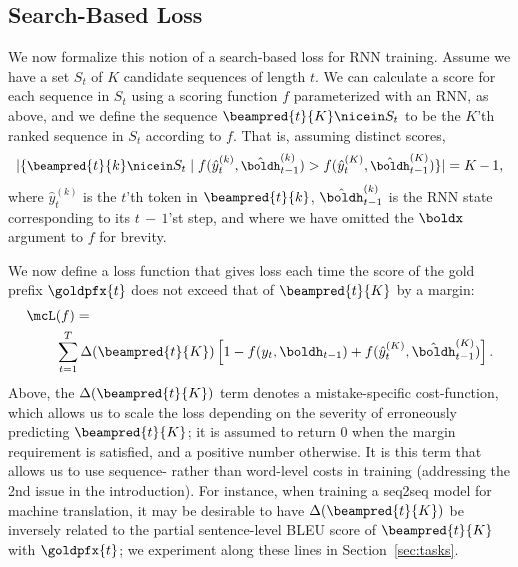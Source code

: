 






\subsection{Search-Based Loss}
We now formalize this notion of a search-based loss for RNN training. Assume we have a
set $S_t$ of $K$ candidate sequences of length $t$. We can calculate a
score for each sequence in $S_t$ using a scoring function $f$
parameterized with an RNN, as above, and we define the
sequence $\beampred{t}{K} \nicein S_t$ to be the $K$'th
ranked sequence in $S_t$ according to $f$. That is, assuming
distinct scores, 
\begin{align*}
\small
|\{ \beampred{t}{k} \nicein S_t \mid f(\hat{y}_t^{(k)}, \hat{\boldh}_{t-1}^{(k)}) > f(\hat{y}_t^{(K)}, \hat{\boldh}_{t-1}^{(K)})\}|
=
K\,{-}\,1,
\end{align*}
where $\hat{y}_t^{(k)}$ is the $t$'th token in $\beampred{t}{k}$,
$\hat{\boldh}_{t-1}^{(k)}$ is the RNN state corresponding to its
$t\,{-}\,1$'st step, and where we have omitted the $\boldx$ argument to $f$ for brevity. %

We now define a loss function that gives loss each time the score of
the gold prefix $\goldpfx{t}$ does not exceed that of
$\beampred{t}{K}$ by a margin:
\begin{align*}
 \mcL&(f) = \\
 &\sum_{t=1}^T \Delta(\beampred{t}{K}) \left[1 - f(y_t, \boldh_{t-1}) + f(\hat{y}_t^{(K)},\hat{\boldh}_{t-1}^{(K)}) \right] .
\end{align*}
Above, the $\Delta(\beampred{t}{K})$ term denotes a
mistake-specific cost-function, which allows us to scale the loss
depending on the severity of erroneously predicting $\beampred{t}{K}$;
it is assumed to return 0 when the margin requirement is satisfied,
and a positive number otherwise. It is this term that allows us to use sequence- rather than word-level costs in training (addressing the 2nd issue in the introduction). For instance, when training a seq2seq model for machine translation, it may be desirable to have $\Delta(\beampred{t}{K})$ be inversely related to the partial sentence-level BLEU score of $\beampred{t}{K}$ with $\goldpfx{t}$; we experiment along these lines in Section~\ref{sec:tasks}. 


